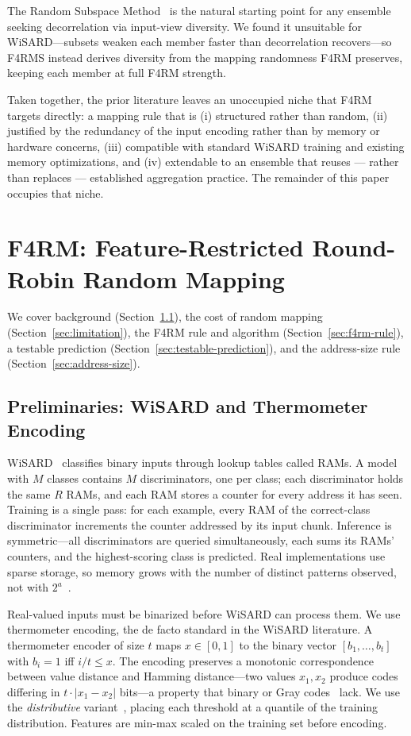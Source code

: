 \documentclass[runningheads]{llncs}
\begin{document}
The Random Subspace Method~\cite{ho1998random} is the natural starting point for any ensemble seeking decorrelation via input-view diversity. We found it unsuitable for WiSARD---subsets weaken each member faster than decorrelation recovers---so F4RMS instead derives diversity from the mapping randomness F4RM preserves, keeping each member at full F4RM strength.

Taken together, the prior literature leaves an unoccupied niche that F4RM targets directly: a mapping rule that is (i) structured rather than random, (ii) justified by the redundancy of the input encoding rather than by memory or hardware concerns, (iii) compatible with standard WiSARD training and existing memory optimizations, and (iv) extendable to an ensemble that reuses --- rather than replaces --- established aggregation practice. The remainder of this paper occupies that niche.


\section{F4RM: Feature-Restricted Round-Robin Random Mapping}
\label{sec:f4rm}

We cover background (Section~\ref{sec:preliminaries}), the cost of random mapping (Section~\ref{sec:limitation}), the F4RM rule and algorithm (Section~\ref{sec:f4rm-rule}), a testable prediction (Section~\ref{sec:testable-prediction}), and the address-size rule (Section~\ref{sec:address-size}).

\subsection{Preliminaries: WiSARD and Thermometer Encoding}
\label{sec:preliminaries}

WiSARD~\cite{aleksander1984wisard} classifies binary inputs through lookup tables called RAMs. A model with $M$ classes contains $M$ discriminators, one per class; each discriminator holds the same $R$ RAMs, and each RAM stores a counter for every address it has seen. Training is a single pass: for each example, every RAM of the correct-class discriminator increments the counter addressed by its input chunk. Inference is symmetric---all discriminators are queried simultaneously, each sums its RAMs' counters, and the highest-scoring class is predicted. Real implementations use sparse storage, so memory grows with the number of distinct patterns observed, not with $2^a$~\cite{susskind2022bthowen}.

Real-valued inputs must be binarized before WiSARD can process them. We use thermometer encoding, the de facto standard in the WiSARD literature. A thermometer encoder of size $t$ maps $x \in [0,1]$ to the binary vector $[b_1,\ldots,b_t]$ with $b_i = 1$ iff $i/t \leq x$. The encoding preserves a monotonic correspondence between value distance and Hamming distance---two values $x_1, x_2$ produce codes differing in $t \cdot |x_1 - x_2|$ bits---a property that binary or Gray codes~\cite{gray1953pulse} lack. We use the \emph{distributive} variant~\cite{lima2020distributive}, placing each threshold at a quantile of the training distribution. Features are min-max scaled on the training set before encoding.
\end{document}
